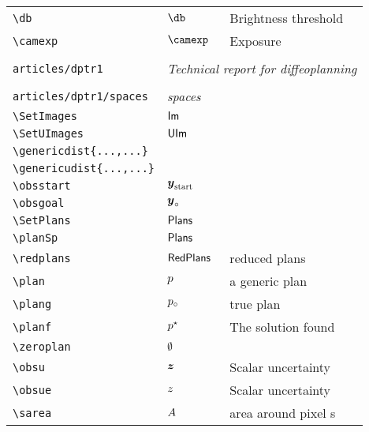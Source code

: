 \begin{longtable}{lll}
 {\color[rgb]{0.5,0.5,0.5}\texttt{\textbackslash db}} & $\db$ &  Brightness threshold\\ 
 {\color[rgb]{0.5,0.5,0.5}\texttt{\textbackslash camexp}} & $\camexp$ &  Exposure\\ 
  &  & \\ 
 {\color[rgb]{0.5,0.5,0.5}\texttt{articles/dptr1}} & \multicolumn{2}{l}{\emph{Technical report for diffeoplanning}}\\ 
 \hline
 &  & \\ 
 {\color[rgb]{0.5,0.5,0.5}\texttt{articles/dptr1/spaces}} & \multicolumn{2}{l}{\emph{spaces}}\\ 
 \hline
{\color[rgb]{0.5,0.5,0.5}\texttt{\textbackslash SetImages}} & $\mathsf{Im}$ & \\ 
 {\color[rgb]{0.5,0.5,0.5}\texttt{\textbackslash SetUImages}} & $\mathsf{UIm}$ & \\ 
 {\color[rgb]{0.5,0.5,0.5}\texttt{\textbackslash genericdist\{...,...\}}} &  & \\ 
 {\color[rgb]{0.5,0.5,0.5}\texttt{\textbackslash genericudist\{...,...\}}} &  & \\ 
 {\color[rgb]{0.5,0.5,0.5}\texttt{\textbackslash obsstart}} & $\boldsymbol{y}_{\text{start}}$ & \\ 
 {\color[rgb]{0.5,0.5,0.5}\texttt{\textbackslash obsgoal}} & $\boldsymbol{y}_{\circ}$ & \\ 
 {\color[rgb]{0.5,0.5,0.5}\texttt{\textbackslash SetPlans}} & $\mathsf{Plans}$ & \\ 
 {\color[rgb]{0.5,0.5,0.5}\texttt{\textbackslash planSp}} & $\mathsf{Plans}$ & \\ 
 {\color[rgb]{0.5,0.5,0.5}\texttt{\textbackslash redplans}} & $\mathsf{RedPlans}$ &  reduced plans\\ 
 {\color[rgb]{0.5,0.5,0.5}\texttt{\textbackslash plan}} & $p$ &  a generic plan\\ 
 {\color[rgb]{0.5,0.5,0.5}\texttt{\textbackslash plang}} & $p_{\circ}$ &  true plan\\ 
 {\color[rgb]{0.5,0.5,0.5}\texttt{\textbackslash planf}} & $p^\star$ &  The solution found \\ 
 {\color[rgb]{0.5,0.5,0.5}\texttt{\textbackslash zeroplan}} & $\emptyset$ & \\ 
 {\color[rgb]{0.5,0.5,0.5}\texttt{\textbackslash obsu}} & $\boldsymbol{z}$ &  Scalar uncertainty\\ 
 {\color[rgb]{0.5,0.5,0.5}\texttt{\textbackslash obsue}} & $z$ &  Scalar uncertainty\\ 
 {\color[rgb]{0.5,0.5,0.5}\texttt{\textbackslash sarea}} & $A$ &  area around pixel s\\ 

\end{longtable}
